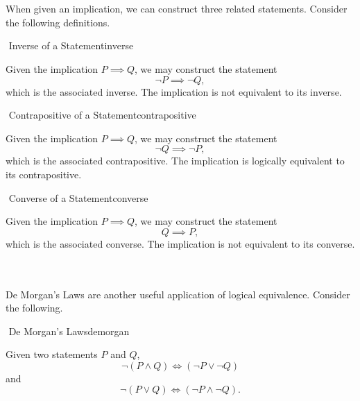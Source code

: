         \pagebreak
        \vphantom
        \\
        \\
        When given an implication, we can construct three related statements. Consider the following definitions.
        \begin{definition}{\Stop\,\,Inverse of a Statement}{inverse}
        
            Given the implication \(P \implies Q\), we may construct the statement
            \begin{equation*}
                \neg P \implies \neg Q,
            \end{equation*}
            which is the associated inverse. The implication is not equivalent to its inverse.
        
        \end{definition}
        \begin{definition}{\Stop\,\,Contrapositive of a Statement}{contrapositive}
        
            Given the implication \(P \implies Q\), we may construct the statement
            \begin{equation*}
                \neg Q \implies \neg P,
            \end{equation*}
            which is the associated contrapositive. The implication is logically equivalent to its contrapositive.
        
        \end{definition}
        \begin{definition}{\Stop\,\,Converse of a Statement}{converse}
        
            Given the implication \(P \implies Q\), we may construct the statement
            \begin{equation*}
                Q \implies P,
            \end{equation*}
            which is the associated converse. The implication is not equivalent to its converse.
        
        \end{definition}
        \vphantom
        \\
        \\
        De Morgan's Laws are another useful application of logical equivalence. Consider the following.
        \begin{theorem}{\Stop\,\,De Morgan's Laws}{demorgan}
        
            Given two statements \(P\) and \(Q\),
            \begin{equation*}
                \neg(P\wedge Q)\iff(\neg P \vee \neg Q)
            \end{equation*}
            and 
            \begin{equation*}
                \neg(P\vee Q)\iff(\neg P \wedge \neg Q).
            \end{equation*}
        
        \end{theorem}
